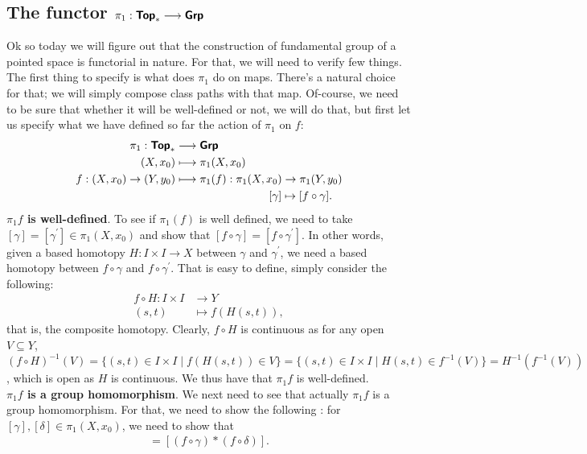 \documentclass[letterpaper,11pt,twoside]{article}
\theoremstyle{definition}
\theoremstyle{definition}
\theoremstyle{definition}
\theoremstyle{definition}
\theoremstyle{definition}
\theoremstyle{definition}
\theoremstyle{remark}
\theoremstyle{definition}
\newcommand{\cat}[1]{{\fontfamily{lmss}\selectfont 
		\text{\textbf{#1}}
}}
\begin{document}
\subsection{The functor $\pi_1 : \cat{Top}_* \longrightarrow \cat{Grp}$}
Ok so today we will figure out that the construction of fundamental group of a pointed space is functorial in nature. For that, we will need to verify few things. The first thing to specify is what does $\pi_1$ do on maps. There's a natural choice for that; we will simply compose class paths with that map. Of-course, we need to be sure that whether it will be well-defined or not, we will do that, but first let us specify what we have defined so far the action of $\pi_1$ on $f$:
\begin{align*}
    \pi_1 : \cat{Top}_* &\longrightarrow \cat{Grp}\\
    (X,x_0) &\longmapsto \pi_1(X,x_0)\\
    f : (X,x_0) \to (Y,y_0) &\longmapsto \pi_1 (f) : \pi_1(X,x_0) \to \pi_1(Y,y_0)\\
    &\;\;\;\;\;\;\;\;\;\;\;\;\;\;\;\;\;\;\;\;\;\;\;\;\;\;\;\;\;\;[\gamma] \mapsto [f\circ \gamma].
\end{align*}
\textbf{$\pi_1 f $ is well-defined}. To see if $\pi_1(f)$ is well defined, we need to take $[\gamma] = [\gamma^\prime] \in \pi_1(X,x_0)$ and show that $[f\circ \gamma] = [f\circ \gamma^\prime]$. In other words, given a based homotopy $H : I\times I \to X$ between $\gamma$ and $\gamma^\prime$, we need a based homotopy between $f\circ \gamma$ and $f\circ \gamma^\prime$. That is easy to define, simply consider the following:
\begin{align*}
    f\circ H : I\times I &\longrightarrow Y\\
    (s,t) &\longmapsto f(H(s,t)),
\end{align*}
that is, the composite homotopy. Clearly, $f\circ H$ is continuous as for any open $V\subseteq Y$, $(f\circ H)^{-1} (V) = \{(s,t)\in I\times I\;\vert\; f(H(s,t)) \in V\} = \{(s,t)\in I\times I\;\vert\; H(s,t) \in f^{-1}(V)\} = H^{-1}(f^{-1}(V))$, which is open as $H$ is continuous. We thus have that $\pi_1 f$ is well-defined.\\
\textbf{$\pi_1 f$ is a group homomorphism}. We next need to see that actually $\pi_1f$ is a group homomorphism. For that, we need to show the following : for $[\gamma], [\delta] \in \pi_1(X,x_0)$, we need to show that
\begin{align*}
    [f\circ (\gamma * \delta)] = [(f\circ \gamma)* (f\circ \delta)].
\end{align*}
\end{document}
